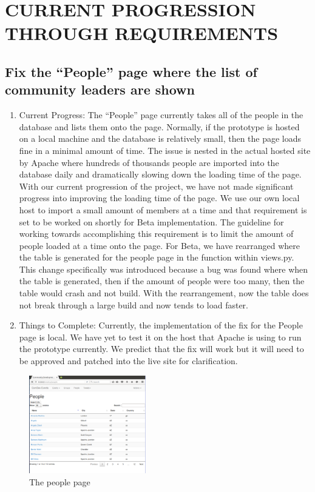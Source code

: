 \documentclass[letterpaper,10pt,onecolumn]{IEEEtran} %
\begin{document}
\section{CURRENT PROGRESSION THROUGH REQUIREMENTS}

\subsection{Fix the “People” page where the list of community leaders are shown}
\begin{enumerate}[label*=\arabic*.]
  \item Current Progress: The “People” page currently takes all of the people in
    the database and lists them onto the page. Normally, if the prototype is
    hosted on a local machine and the database is relatively small, then the page
    loads fine in a minimal amount of time. The issue is nested in the actual
    hosted site by Apache where hundreds of thousands people are imported into the
    database daily and dramatically slowing down the loading time of the page.
    With our current progression of the project, we have not made significant
    progress into improving the loading time of the page. We use our own local
    host to import a small amount of members at a time and that requirement is set
    to be worked on shortly for Beta implementation. The guideline for working
    towards accomplishing this requirement is to limit the amount of people loaded
    at a time onto the page. For Beta, we have rearranged where the table is
    generated for the people page in the function within views.py. This change
    specifically was introduced because a bug was found where when the table is
    generated, then if the amount of people were too many, then the table would
    crash and not build. With the rearrangement, now the table does not break
    through a large build and now tends to load faster.

  \item Things to Complete: Currently, the implementation of the fix for the
    People page is local. We have yet to test it on the host that Apache is
    using to run the prototype currently. We predict that the fix will work but
    it will need to be approved and patched into the live site for
    clarification.
\end{enumerate}

\begin{figure}[htp]
  \begin{center}
  
  \includegraphics[width=2in]{peoplePage}
  \centering
  \caption{The people page}

  \end{center}
\end{figure}
\end{document}
